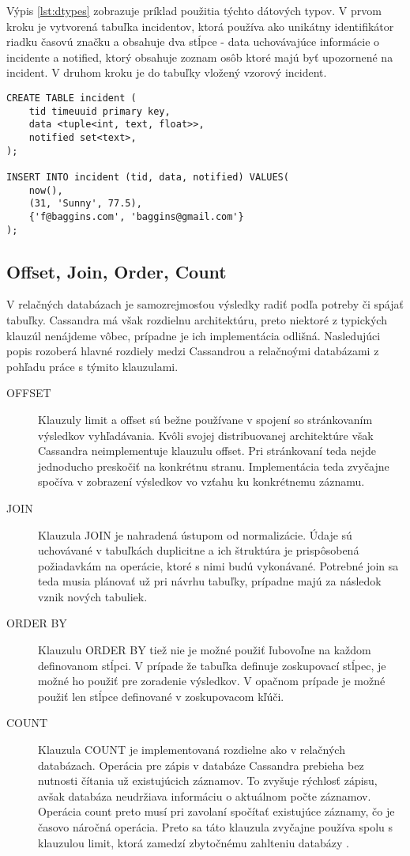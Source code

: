 	Výpis \ref{lst:dtypes} zobrazuje príklad použitia týchto dátových typov. V prvom kroku je vytvorená tabuľka incidentov, ktorá používa ako unikátny identifikátor riadku časovú značku a obsahuje dva stĺpce - data uchovávajúce informácie o incidente a notified, ktorý obsahuje zoznam osôb ktoré majú byť upozornené na incident.
	V druhom kroku je do tabuľky vložený vzorový incident.
	\begin{lstlisting}[label=lst:dtypes,caption=Príklad použitia dátových typov databázy Cassandra]
CREATE TABLE incident (
	tid timeuuid primary key,
	data <tuple<int, text, float>>,
	notified set<text>,
);

INSERT INTO incident (tid, data, notified) VALUES(
	now(),
	(31, 'Sunny', 77.5),
	{'f@baggins.com', 'baggins@gmail.com'}
);
	\end{lstlisting}

	\subsection{Offset, Join, Order, Count}
	V relačných databázach je samozrejmosťou výsledky radiť podľa potreby či spájať tabuľky. Cassandra má však rozdielnu architektúru, preto niektoré z typických klauzúl nenájdeme vôbec, prípadne je ich implementácia odlišná. Nasledujúci popis rozoberá hlavné rozdiely medzi Cassandrou a relačnoými databázami z pohľadu práce s týmito klauzulami.
	
	\begin{description}
	\item[OFFSET] Klauzuly limit a offset sú bežne používane v spojení so stránkovaním výsledkov vyhľadávania. Kvôli svojej distribuovanej architektúre však Cassandra neimplementuje klauzulu offset. Pri stránkovaní teda nejde jednoducho preskočiť na konkrétnu stranu. Implementácia teda zvyčajne spočíva v zobrazení výsledkov vo vzťahu ku konkrétnemu záznamu.

	\item[JOIN] Klauzula JOIN je nahradená ústupom od normalizácie. Údaje sú uchovávané v tabuľkách duplicitne a ich štruktúra je prispôsobená požiadavkám na operácie, ktoré s nimi budú vykonávané. Potrebné join sa teda musia plánovať už pri návrhu tabuľky, prípadne majú za následok vznik nových tabuliek.
	
	\item[ORDER BY] Klauzulu ORDER BY tiež nie je možné použiť ľubovoľne na každom definovanom stĺpci. V prípade že tabuľka definuje zoskupovací stĺpec, je možné ho použiť pre zoradenie výsledkov. V opačnom prípade je možné použiť len stĺpce definované v zoskupovacom kľúči.
	
	\item[COUNT] Klauzula COUNT je implementovaná rozdielne ako v relačných databázach. Operácia pre zápis v databáze Cassandra prebieha bez nutnosti čítania už existujúcich záznamov. To zvyšuje rýchlosť zápisu, avšak databáza neudržiava informáciu o aktuálnom počte záznamov. Operácia count preto musí pri zavolaní spočítať existujúce záznamy, čo je časovo náročná operácia. Preto sa táto klauzula zvyčajne používa spolu s klauzulou limit, ktorá zamedzí zbytočnému zahlteniu databázy \cite{cascount}.
	\end{description}
	
